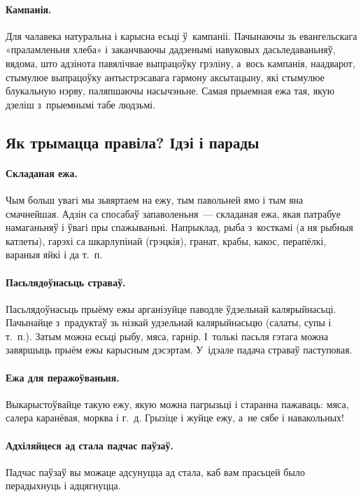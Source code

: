 \paragraph{Кампанія.}
Для чалавека натуральна і карысна есьці ў~кампаніі. Пачынаючы зь евангельскага «праламленьня хлеба» і заканчваючы дадзенымі навуковых дасьледаваньняў, вядома, што адзінота павялічвае выпрацоўку грэліну, а~вось кампанія, наадварот, стымулюе выпрацоўку антыстрэсавага гармону аксытацыну, які стымулюе блукальную нэрву, паляпшаючы насычэньне. Самая прыемная ежа тая, якую дзеліш з~прыемнымі табе людзьмі.

\subsection{Як трымацца правіла? Ідэі і парады}

\paragraph{Складаная ежа.}
Чым больш увагі мы зьвяртаем на ежу, тым павольней ямо і тым яна смачнейшая. Адзін са спосабаў запаволеньня~--- складаная ежа, якая патрабуе намаганьняў і ўвагі пры спажываньні. Напрыклад, рыба з~косткамі (а ня рыбныя катлеты), гарэхі са шкарлупінай (грэцкія), гранат, крабы, какос, перапёлкі, вараныя яйкі і да т.~п.

\paragraph{Пасьлядоўнасьць страваў.}
Пасьлядоўнасьць прыёму ежы арганізуйце паводле ўдзельнай калярыйнасьці. Пачынайце з~прадуктаў зь нізкай удзельнай калярыйнасьцю (салаты, супы і т.~п.). Затым можна есьці рыбу, мяса, гарнір. І~толькі пасьля гэтага можна завяршыць прыём ежы карысным дэсэртам. У~ідэале падача страваў паступовая.

\paragraph{Ежа для перажоўваньня.}
Выкарыстоўвайце такую ежу, якую можна пагрызьці і старанна пажаваць: мяса, салера каранёвая, морква і г.~д. Грызіце і жуйце ежу, а~не сябе і навакольных!


\paragraph{Адхіляйцеся ад стала падчас паўзаў.}
Падчас паўзаў вы можаце адсунуцца ад стала, каб вам прасьцей было перадыхнуць і адцягнуцца.

